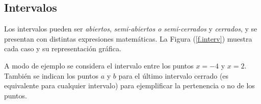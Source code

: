%



\subsection{Intervalos}
\label{c.interv}

Los intervalos pueden ser \textit{abiertos}, \textit{semi-abiertos o
semi-cerrados} y \textit{cerrados}, y se presentan con distintas expresiones
matemáticas. La Figura (\ref{f.interv}) muestra cada caso y su representación
gráfica.


A modo de ejemplo se considera el intervalo entre los puntos $x=-4$ y $x=2$.
También se indican los puntos $a$ y $b$ para el último intervalo cerrado (es
equivalente para cualquier intervalo) para ejemplificar la pertenencia o no de
los puntos.

